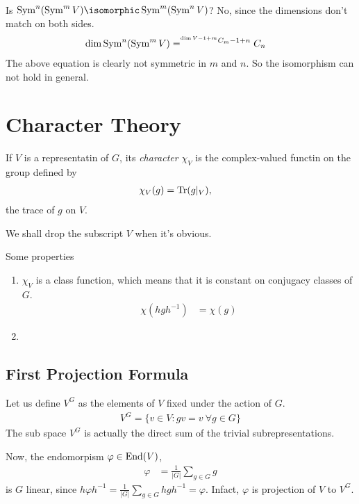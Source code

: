 \noindent{}\\
 Is $\Sym^n(\Sym^mV)\isomorphic \Sym^m(\Sym^n V)$? No, since the dimensions don't match on both sides.
\begin{align}
    \dim \operatorname{Sym}^n(\operatorname{Sym}^mV) &= ^{{}^{\dim V - 1 + m}C_{m} -1 +n}C_{n}
\end{align}
The above equation is clearly not symmetric in $m$ and $n$. So the isomorphism can not hold in general.


\chapter{Character Theory}
\label{cha:character_theory}
\begin{definition}
    If $V$ is a representatin of $G$, its \emph{character} $\chi_V$ is the complex-valued functin on the group defined by
    \begin{align}
        \chi_V(g) &= \operatorname{Tr}(g|_V),
    \end{align}
    the trace of $g$ on $V$.
\end{definition}

We shall drop the subscript $V$ when it's obvious.

Some properties
\begin{enumerate}
    \item $\chi_V$ is a class function, which means that it is constant on conjugacy classes  of $G$.
        \begin{align}
            \chi(hgh^{-1}) &= \chi(g)
        \end{align}
    \item 
\end{enumerate}

\section{First Projection Formula}
\label{sec:first_projection_formula}
Let us define $V^G$ as the elements of $V$ fixed under the action of $G$.
\begin{align}
    V^G=\{v\in V: gv=v\ \forall g\in G \}
\end{align}
The sub space $V^G$ is actually the direct sum of the trivial subrepresentations.

Now, the endomorpism $\varphi \in \operatorname{End}(V)$, 
\begin{align}
    \varphi &= \frac{1}{|G|} \sum_{g\in G} g
\end{align}
is $G$ linear, since $h\varphi h^{-1} = \frac{1}{|G|}\sum_{g\in G} hgh^{-1} = \varphi$.  Infact, $\varphi$ is projection of $V$ to $V^G$.

